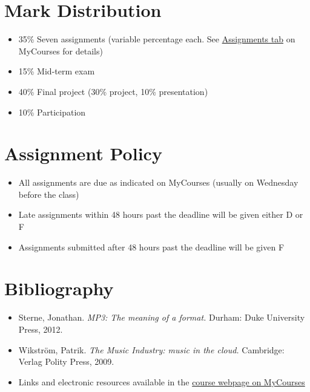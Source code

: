 \documentclass[11pt]{amsart}
\begin{document}
\section{Mark Distribution}
\begin{itemize}
\item 35\% Seven assignments (variable percentage each. See \href{https://mycourses2.mcgill.ca/d2l/lms/dropbox/user/folders_list.d2l?ou=186686&isprv=0}{Assignments tab} on MyCourses for details)
\item 15\% Mid-term exam
\item 40\% Final project (30\% project, 10\% presentation)
\item 10\% Participation
\end{itemize}

\section{Assignment Policy}
\begin{itemize}
\item All assignments are due as indicated on MyCourses (usually on Wednesday before the class)
\item Late assignments within 48 hours past the deadline will be given either D or F
\item Assignments submitted after 48 hours past the deadline will be given F
\end{itemize}

\section{Bibliography}
\begin{itemize}
\item Sterne, Jonathan. \emph{MP3: The meaning of a format.} Durham: Duke University Press, 2012.
\item Wikstr\"{o}m, Patrik. \emph{The Music Industry: music in the cloud.} Cambridge: Verlag Polity Press, 2009.
\item Links and electronic resources available in the \href{https://mycourses2.mcgill.ca/d2l/lms/links/view_links.d2l?ou=186686&d2l_stateScopes=%7B1%3A%5B%27gridpagenum%27,%27search%27,%27pagenum%27%5D,2%3A%5B%27lcs%27%5D,3%3A%5B%27grid%27,%27pagesize%27,%27htmleditor%27,%27hpg%27%5D%7D&d2l_stateGroups=%5B%27page%27%5D&d2l_statePageId=499&d2l_state_page=%7B%27Name%27%3A%27page%27,%27Controls%27%3A%5B%7B%27ControlId%27%3A%7B%27ID%27%3A%27slctlst_category%27%7D,%27StateType%27%3A%27%27,%27Key%27%3A%27%27,%27Name%27%3A%27category%27,%27State%27%3A%7B%27SelectedKey%27%3A%270%27,%27SelectedVal%27%3A%270%27%7D%7D%5D%7D&d2l_change=0#20825}{course webpage on MyCourses}

\end{itemize}
\end{document}
